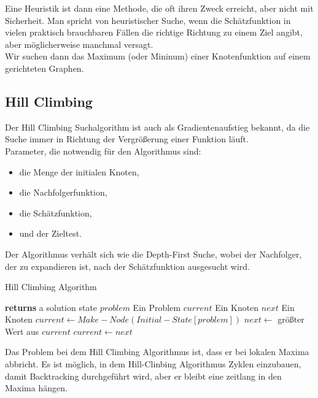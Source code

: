 Eine Heuristik ist dann eine Methode, die oft ihren Zweck erreicht, aber nicht mit Sicherheit. Man spricht von heuristischer Suche, wenn die Schätzfunktion in vielen praktisch brauchbaren Fällen die richtige Richtung zu einem Ziel angibt, aber möglicherweise manchmal versagt.\\

Wir suchen dann das Maximum (oder Mininum) einer Knotenfunktion auf einem gerichteten Graphen.\\

\subsection{Hill Climbing}
\bigskip
Der Hill Climbing Suchalgorithm ist auch als Gradientenaufstieg bekannt, da die Suche immer in Richtung der Vergrößerung einer Funktion läuft.\\

Parameter, die notwendig für den Algorithmus sind:

\begin{itemize}
  \item die Menge der initialen Knoten,
  \item die Nachfolgerfunktion,
  \item die Schätzfunktion,
  \item und der Zieltest.
\end{itemize}

Der Algorithmus verhält sich wie die Depth-First Suche, wobei der Nachfolger, der zu expandieren ist, nach der Schätzfunktion ausgesucht wird.\\

\begin{algorithm}
\caption{Hill Climbing Algorithm}
\begin{algorithmic}[1]
 \State \textbf{returns} a solution state
\INPUT
\Statex $problem$ \Comment Ein Problem
\Statex $current$  \Comment Ein Knoten
\Statex $next$  \Comment Ein Knoten
\State $current \gets Make-Node(Initial-State[problem])$
\Loop
\State $next \gets$ größter Wert aus $current$
\State $current \gets next$
\EndLoop
\EndFunction
\end{algorithmic}
\end{algorithm}


Das Problem bei dem Hill Climbing Algorithmus ist, dass er bei lokalen Maxima abbricht. Es ist möglich, in dem Hill-Clinbing Algorithmus Zyklen einzubauen, damit Backtracking durchgeführt wird, aber er bleibt eine zeitlang in den Maxima hängen.\\

